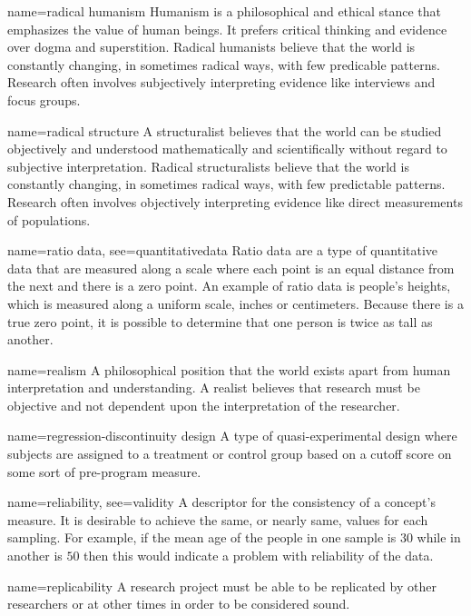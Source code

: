 {name={radical humanism}}
{%
	Humanism is a philosophical and ethical stance that emphasizes the value of human beings. It prefers critical thinking and evidence over dogma and superstition. Radical humanists believe that the world is constantly changing, in sometimes radical ways, with few predicable patterns. Research often involves subjectively interpreting evidence like interviews and focus groups.
}

{name={radical structure}}
{%
	A structuralist believes that the world can be studied objectively and understood mathematically and scientifically without regard to subjective interpretation. Radical structuralists believe that the world is constantly changing, in sometimes radical ways, with few predictable patterns. Research often involves objectively interpreting evidence like direct measurements of populations.
}

{name={ratio data},
	see={quantitativedata}}
{%
	Ratio data are a type of quantitative data that are measured along a scale where each point is an equal distance from the next and there is a zero point. An example of ratio data is people's heights, which is measured along a uniform scale, \eg inches or centimeters. Because there is a true zero point, it is possible to determine that one person is twice as tall as another.
}

{name={realism}}
{%
	A philosophical position that the world exists apart from human interpretation and understanding. A realist believes that research must be objective and not dependent upon the interpretation of the researcher.
}

{name={regression-discontinuity design}}
{%
	A type of quasi-experimental design where subjects are assigned to a treatment or control group based on a cutoff score on some sort of pre-program measure.
}

	{name={reliability},
	 see={validity}}
	{%
		A descriptor for the consistency of a concept's measure. It is desirable to achieve the same, or nearly same, values for each sampling. For example, if the mean age of the people in one sample is $ 30 $ while in another is $ 50 $ then this would indicate a problem with reliability of the data.
	}

{name={replicability}}
{%
	A research project must be able to be replicated by other researchers or at other times in order to be considered sound.
}

